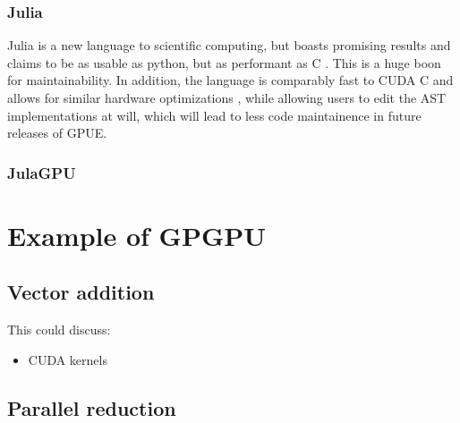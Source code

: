 \subsubsection{Julia}
Julia is a new language to scientific computing, but boasts promising results and claims to be as usable as python, but as performant as C .
This is a huge boon for maintainability.
In addition, the language is comparably fast to CUDA C and allows for similar hardware optimizations \cite{besard2016, besard2018}, while allowing users to edit the AST implementations at will, which will lead to less code maintainence in future releases of GPUE.


\subsubsection{JulaGPU}

\section{Example of GPGPU}

\subsection{Vector addition}

This could discuss:
\begin{itemize}
\item CUDA kernels
\end{itemize}

\subsection{Parallel reduction}
